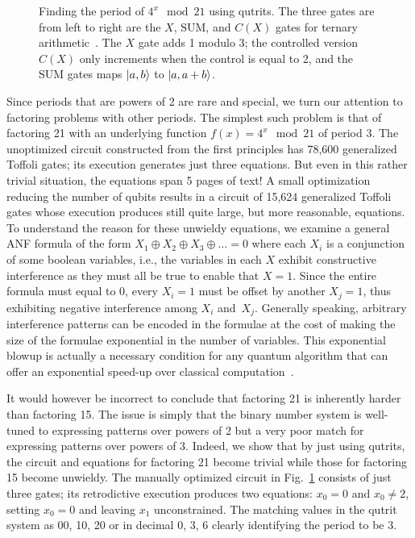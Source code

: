 \documentclass[sigplan,screen]{acmart}
\theoremstyle{definition}
\begin{document}
\begin{figure}
  \centering
\caption{\label{fig:shor21}Finding the period of $4^x \mod{21}$ using
  qutrits. The three gates are from left to right are the $X$,
  $\textrm{SUM}$, and $C(X)$ gates for ternary
  arithmetic~\cite{10.5555/3179473.3179481}. The $X$ gate adds 1
  modulo 3; the controlled version $C(X)$ only increments when the
  control is equal to 2, and the \textrm{SUM} gates maps $\ket{a,b}$
  to $\ket{a,a+b}$.}
\end{figure}
Since periods that are powers of 2 are rare and special, we turn our
attention to factoring problems with other periods. The simplest such
problem is that of factoring 21 with an underlying function
$f(x) = 4^x \mod{21}$ of period 3. The unoptimized circuit constructed
from the first principles has 78,600 generalized Toffoli gates; its
execution generates just three equations. But even in this rather
trivial situation, the equations span 5 pages of text!  A small
optimization reducing the number of qubits results in a circuit of
15,624 generalized Toffoli gates whose execution produces still quite
large, but more reasonable, equations. To understand the reason for
these unwieldy equations, we examine a general ANF formula of the form
$ X_1 \oplus X_2 \oplus X_3 \oplus \ldots = 0$ where each $X_i$ is a
conjunction of some boolean variables, i.e., the variables in each $X$
exhibit constructive interference as they must all be true to enable
that $X=1$. Since the entire formula must equal to 0, every $X_i = 1$
must be offset by another $X_j = 1$, thus exhibiting negative
interference among $X_i$ and~$X_j$. Generally speaking, arbitrary
interference patterns can be encoded in the formulae at the cost of
making the size of the formulae exponential in the number of
variables. This exponential blowup is actually a necessary condition
for any quantum algorithm that can offer an exponential speed-up over
classical computation~\cite{10.2307/3560059}.

It would however be incorrect to conclude that factoring 21 is
inherently harder than factoring 15. The issue is simply that the
binary number system is well-tuned to expressing patterns over powers
of 2 but a very poor match for expressing patterns over powers of
3. Indeed, we show that by just using qutrits, the circuit and
equations for factoring 21 become trivial while those for factoring 15
become unwieldy. The manually optimized circuit in
Fig.~\ref{fig:shor21} consists of just three gates; its retrodictive
execution produces two equations: $x_0=0$ and $x_0 \neq 2$, setting
$x_0=0$ and leaving $x_1$ unconstrained. The matching values in the
qutrit system as 00, 10, 20 or in decimal 0, 3, 6 clearly identifying
the period to be 3. 
\end{document}
